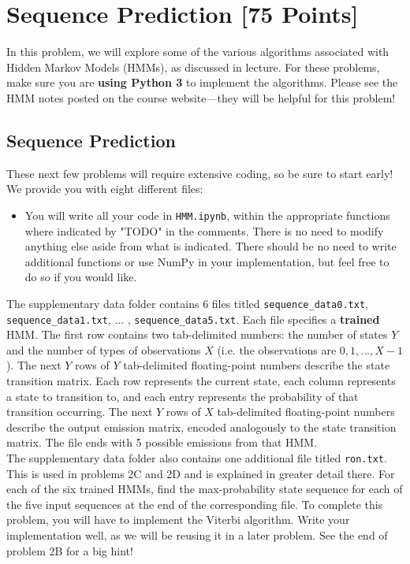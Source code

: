 \begin{solution}
\end{solution}


\newpage
\section{Sequence Prediction [75 Points]}

In this problem, we will explore some of the various algorithms associated with Hidden Markov Models (HMMs), as discussed in lecture.  For these problems, make sure you are \textbf{using Python 3} to implement the algorithms. Please see the HMM notes posted on the course website---they will be helpful for this problem!

\subsection{Sequence Prediction}

These next few problems will require extensive coding, so be sure to start early! We provide you with eight different files:
\begin{itemize}
  \item You will write all your code in \texttt{HMM.ipynb}, within the appropriate functions where indicated by "TODO" in the comments. There is no need to modify anything else aside from what is indicated. There should be no need to write additional functions or use NumPy in your implementation, but feel free to do so if you would like. 
\end{itemize}

The supplementary data folder contains 6 files titled \texttt{sequence_data0.txt}, \texttt{sequence_data1.txt}, ... , \texttt{sequence_data5.txt}. Each file specifies a \textbf{trained} HMM. The first row contains two tab-delimited numbers: the number of states $Y$ and the number of types of observations $X$ (i.e. the observations are $0, 1, . . . , X - 1$). The next $Y$ rows of $Y$ tab-delimited floating-point numbers describe the state transition matrix. Each row represents the current state, each column represents a state to transition to, and each entry represents the probability of that transition occurring. The next $Y$ rows of $X$ tab-delimited floating-point numbers describe the output emission matrix, encoded analogously to the state transition matrix. The file ends with 5 possible emissions from that HMM. \\

The supplementary data folder also contains one additional file titled \texttt{ron.txt}. This is used in problems 2C and 2D and is explained in greater detail there. 
\indent\problem[10] %
For each of the six trained HMMs, find the max-probability state sequence for each of the five input sequences at the end of the corresponding file. To complete this problem, you will have to implement the Viterbi algorithm. Write your implementation well, as we will be reusing it in a later problem. See the end of problem 2B for a big hint!

